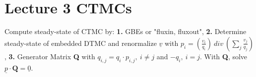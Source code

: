 \section{Lecture 3 CTMCs}
Compute steady-state of CTMC by: \textbf{1.} GBEs or "fluxin, fluxout", \textbf{2.} Determine steady-state of embedded DTMC and renormalize $\underline{v}$ with $p_{i} = (\frac{v_{i}}{q_{i}})\ div\ (\sum_{j} \frac{v_{j}}{q_{j}})$, \textbf{3.} Generator Matrix \textbf{Q} with $q_{i,j} = q_{i} \cdot p_{i,j},\ i \neq j$ and $-q_{i},\ i=j$. With \textbf{Q}, solve $\underline{p} \cdot \textbf{Q} = \underline{0}$.\\

\blindtext
\blindtext
\blindtext
\blindtext
\blindtext
\blindtext
\blindtext
\blindtext
\blindtext